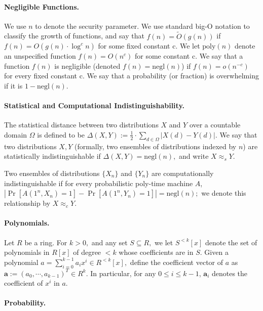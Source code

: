 \documentclass[11pt]{article}
\newcommand{\negl}[1]{\text{negl}(#1)}
\newcommand{\abs}[1]{|#1 |}
\begin{document}
\paragraph{Negligible Functions.}
We use $n$ to denote the security parameter. We use standard big-O notation to classify the growth of functions, and say that $f(n) = \tilde{O}(g(n))$ if $f(n) = O(g(n) \cdot \log^c n)$ for some fixed constant c. We let $\text{poly}(n)$ denote an unspecified function
$f(n) = O(n^c)$ for some constant c. We say that a function $f(n)$ is {negligible} (denoted $f(n) = \negl{n}$) if $f(n) = o(n^{-c})$ for every fixed constant c. %
We say that a probability (or fraction) is overwhelming if it is
$1 -\negl{n}.$

\paragraph{Statistical and Computational Indistinguishability.} The statistical distance between two distributions $X$ and $Y$ over a countable domain $\Omega$ is defined to be $\Delta (X, Y):=\frac 1 2 \cdot \sum_{d\in \Omega} \abs{X(d) - Y (d)}.$ We say that two distributions $X, Y$ (formally, two ensembles of distributions indexed by $n$) are statistically indistinguishable if $\Delta(X, Y) =\negl{n},$ and write $X \approx_s Y.$

Two ensembles of distributions $\{X_n\}$ and $\{Y_n\}$ are computationally indistinguishable if for every probabilistic poly-time machine $A$, $|\Pr[A(1^n , X_n) = 1] - \Pr[A(1^n
, Y_n) = 1]|=\negl{n};$ we denote this relationship by $X\approx_c Y.$  

\paragraph{Polynomials.} Let $R$ be a ring. For $k > 0,$ and any set $S \subseteq R,$ we let $S^{<k}[x]$ denote the set of polynomials in $R[x]$ of degree $< k$ whose coefficients are in $S.$ Given a polynomial $a =\sum_{i=0}^{k-1} a_i x^i \in R^{< k}[x],$ define the coefficient vector of $a$ as $\textbf{a}:=(a_0,\cdots, a_{k-1})^T \in R^k.$ In particular, for any $0\leq i \leq k-1$, $\textbf{a}_i$ denotes the coefficient of $x^i$ in $a.$

\paragraph{Probability.} 
\end{document}
